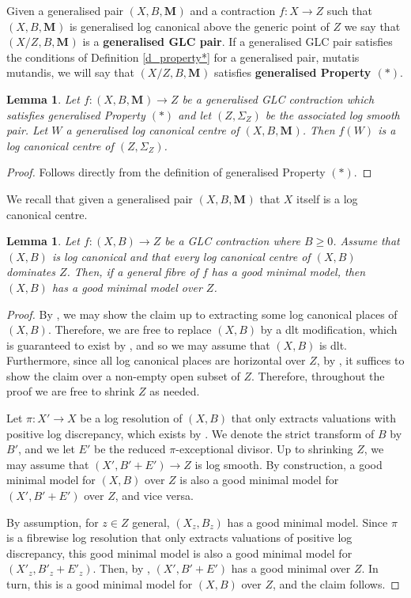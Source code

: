 \documentclass[12pt]{amsart}
\theoremstyle{plain}
\newtheorem{lemma}[theorem]{Lemma}
\theoremstyle{definition}
\def\rar{\rightarrow}
\def\bM#1.{\mathbf{M}_{#1}}
\begin{document}
Given a generalised pair $(X, B,\bM.)$ and a contraction $f\colon X \rightarrow Z$ such that $(X, B,\bM.)$ is generalised log canonical
above the generic point of $Z$ we say that $(X/Z, B,\bM.)$ is a {\bf generalised GLC pair}.
If a generalised GLC pair satisfies the conditions of Definition \ref{d_property*} 
for a generalised pair, mutatis mutandis, we will
say that $(X/Z, B,\bM.)$ satisfies {\bf generalised Property $(*)$}.


\begin{lemma}
\label{lem_img_lc_centre_is_lc}
Let $f\colon (X, B, \bM.)\rightarrow Z$ be a generalised GLC contraction which satisfies generalised Property $(*)$
and let $(Z, \Sigma_Z)$ be the associated log smooth pair.
Let $W$ a generalised log canonical centre of $(X, B, \bM.)$.  Then $f(W)$ is a log canonical 
centre of $(Z, \Sigma_Z)$.  
\end{lemma}
\begin{proof}
Follows directly from the definition of generalised Property $(*)$.
\end{proof}
We recall that given a generalised pair $(X, B, \bM.)$ that $X$ itself is a log canonical centre.

\begin{lemma} \label{good_mm_fibre_to_space}
Let $f \colon (X,B) \rar Z$ be a GLC contraction where $B \geq 0$.
Assume that $(X,B)$ is log canonical and that every log canonical centre of $(X,B)$ dominates $Z$.
Then, if a general fibre of $f$ has a good minimal model, then $(X,B)$ has a good minimal model over $Z$.
\end{lemma}

\begin{proof}
By \cite[Theorem 2.9]{LT19}, we may show the claim up to extracting some log canonical places of $(X,B)$.  Therefore, we are free to replace $(X, B)$ by a dlt modification, which is guaranteed to exist by \cite[Theorem 3.1]{KK09}, and so we may assume that $(X, B)$ is dlt.
Furthermore, since all log canonical places are horizontal over $Z$, by \cite[Theorem 1.1]{HX11}, it suffices to show the claim over a non-empty open subset of $Z$.
Therefore, throughout the proof we are free to shrink $Z$ as needed.

Let $\pi \colon X' \rar X$ be a log resolution of $(X,B)$ that only extracts valuations with positive log discrepancy, which exists by \cite[Theorem 2.44]{KM98}.
We denote the strict transform of $B$ by $B'$, and we let $E'$ be the reduced $\pi$-exceptional divisor.
Up to shrinking $Z$, we may assume that $(X',B'+E') \rar Z$ is log smooth.
By construction, a good minimal model for $(X,B)$ over $Z$ is also a good minimal model for $(X',B'+E')$ over $Z$, and vice versa.

By assumption, for $z \in Z$ general, $(X_z,B_z)$ has a good minimal model.
Since $\pi$ is a fibrewise log resolution that only extracts valuations of positive log discrepancy, this good minimal model is also a good minimal model for $(X'_z,B'_z+E'_z)$.
Then, by \cite[Theorem 1.2]{HMX14}, $(X',B'+E')$ has a good minimal over $Z$.
In turn, this is a good minimal model for $(X,B)$ over $Z$, and the claim follows.
\end{proof}
\end{document}
